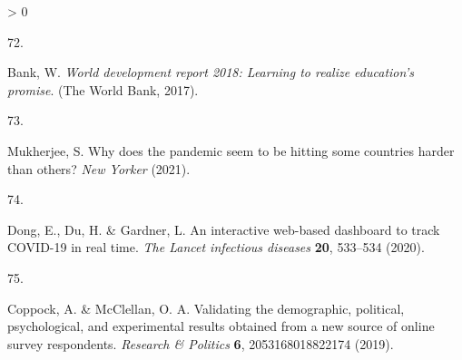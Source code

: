 \documentclass[
  12pt,
]{article}
\newlength{\cslhangindent}
\newlength{\csllabelwidth}
\newenvironment{CSLReferences}[2] %
 {%
  \setlength{\parindent}{0pt}
  \ifodd #1 \everypar{\setlength{\hangindent}{\cslhangindent}}\ignorespaces\fi
  \ifnum #2 > 0
  \setlength{\parskip}{#2\baselineskip}
  \fi
 }%
 {}
\newcommand{\CSLLeftMargin}[1]{\parbox[t]{\csllabelwidth}{#1}}
\newcommand{\CSLRightInline}[1]{\parbox[t]{\linewidth - \csllabelwidth}{#1}\break}
\begin{document}
\begin{CSLReferences}{0}{0}
\leavevmode\hypertarget{ref-world2017world}{}%
\CSLLeftMargin{72. }
\CSLRightInline{Bank, W. \emph{World development report 2018: Learning to realize education's promise}. (The World Bank, 2017).}

\leavevmode\hypertarget{ref-mukherjee}{}%
\CSLLeftMargin{73. }
\CSLRightInline{Mukherjee, S. Why does the pandemic seem to be hitting some countries harder than others? \emph{New Yorker} (2021).}

\leavevmode\hypertarget{ref-dong2020interactive}{}%
\CSLLeftMargin{74. }
\CSLRightInline{Dong, E., Du, H. \& Gardner, L. An interactive web-based dashboard to track COVID-19 in real time. \emph{The Lancet infectious diseases} \textbf{20}, 533--534 (2020).}

\leavevmode\hypertarget{ref-coppock2019validating}{}%
\CSLLeftMargin{75. }
\CSLRightInline{Coppock, A. \& McClellan, O. A. Validating the demographic, political, psychological, and experimental results obtained from a new source of online survey respondents. \emph{Research \& Politics} \textbf{6}, 2053168018822174 (2019).}

\end{CSLReferences}
\end{document}
